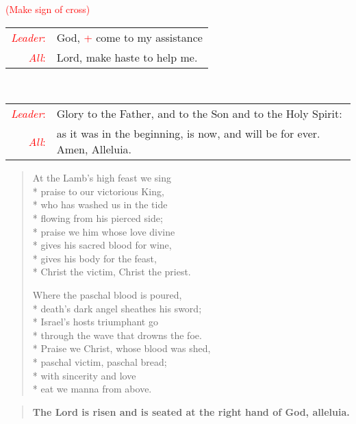 \documentclass[letterpaper,14pt]{extarticle}
\newcommand{\side}[1]{\flagverse{\textcolor{red}{\textit{#1}}:}}
\newcommand{\sidestar}[1]{\textcolor{red}{\textit{#1}:}}
\newcommand{\rednote}[1]{\textcolor{red}{#1}}
\newlength{\oldindent}
\newcommand{\antiphon}[2]{
	\setlength{\oldindent}{\vindent}
	\setlength{\vindent}{0em}
	\begin{verse}
	\side{#1} \textbf{#2}
	\end{verse}
	\setlength{\vindent}{\oldindent}
}
\newcommand{\intercession}[2]{
	\begin{tabular}[h]{r p{4.25in}}
		\sidestar{Leader} & #1 \\
		\sidestar{All} & #2
	\end{tabular}}
\begin{document}
\hspace{\leftmargini}\rednote{(Make sign of cross)}\\
\intercession{God, \rednote{+} come to my assistance}
{Lord, make haste to help me.}\\
\intercession{Glory to the Father, and to the Son and to the Holy Spirit:}
{as it was in the beginning, is now, and will be for ever. Amen, Alleluia.}

\begin{verse}
At the Lamb's high feast we sing \\*
praise to our victorious King, \\*
who has washed us in the tide \\*
flowing from his pierced side; \\*
praise we him whose love divine \\*
gives his sacred blood for wine, \\*
gives his body for the feast, \\*
Christ the victim, Christ the priest.

Where the paschal blood is poured, \\*
death's dark angel sheathes his sword; \\*
Israel's hosts triumphant go \\*
through the wave that drowns the foe. \\*
Praise we Christ, whose blood was shed, \\*
paschal victim, paschal bread; \\*
with sincerity and love \\*
eat we manna from above.
\end{verse}
{}
\antiphon{Leader 1}{The Lord is risen and is seated at the right hand of God,
alleluia.}  
\end{document}
